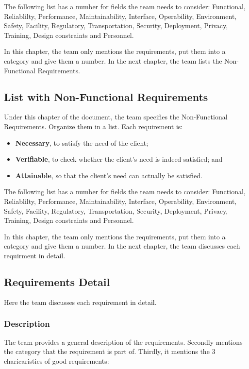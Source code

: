 \documentclass[10pt]{report}
\begin{document}
The following list has a number for fields the team needs to consider: Functional, Reliablilty, Performance, Maintainability, Interface, Operability, Environment, Safety, Facility, Regulatory, Transportation, Security, Deployment, Privacy, Training, Design constraints and Personnel.

In this chapter, the team only mentions the requirements, put them into a category and give them a number. In the next chapter, the team lists the Non-Functional Requirements.

\subsection{List with Non-Functional Requirements}

Under this chapter of the document, the team specifies the Non-Functional Requirements. Organize them in a list. Each requirement is:

\begin{itemize}
	\item \textbf{Necessary}, to satisfy the need of the client;
	\item \textbf{Verifiable}, to check whether the client's need is indeed satisfied; and
	\item \textbf{Attainable}, so that the client's need can actually be satisfied. 
\end{itemize}

The following list has a number for fields the team needs to consider: Functional, Reliablilty, Performance, Maintainability, Interface, Operability, Environment, Safety, Facility, Regulatory, Transportation, Security, Deployment, Privacy, Training, Design constraints and Personnel.

In this chapter, the team only mentions the requirements, put them into a category and give them a number. In the next chapter, the team discusses each requirment in detail.

\subsection{Requirements Detail}

Here the team discusses each requirement in detail. 

\subsubsection{Description}

The team provides a general description of the requirements. Secondly mentions the category that the requirement is part of. Thirdly, it mentions the 3 charicaristics of good requirements:
\end{document}
